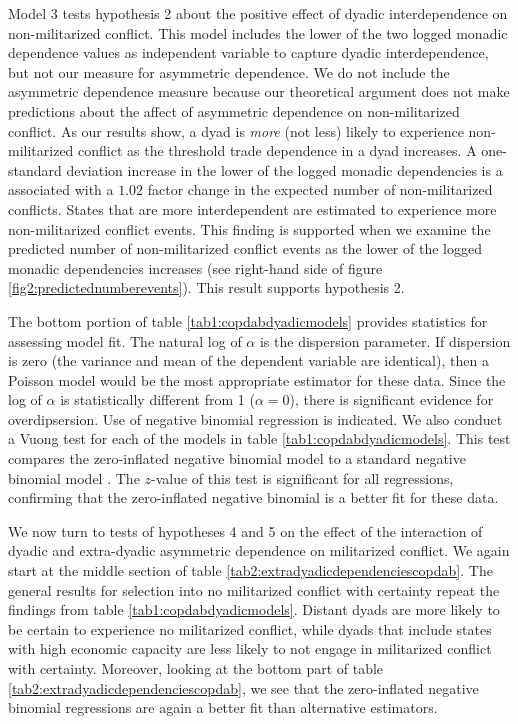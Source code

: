 \documentclass[12pt]{article}
\theoremstyle{hypothesis}
\begin{document}
Model 3 tests hypothesis 2 about the positive effect of dyadic interdependence on non-militarized conflict. This model includes the lower of the two logged monadic dependence values as independent variable to capture dyadic interdependence, but not our measure for asymmetric dependence. We do not include the asymmetric dependence measure because our theoretical argument does not make predictions about the affect of asymmetric dependence on non-militarized conflict. As our results show, a dyad is \textit{more} (not less) likely to experience non-militarized conflict as the threshold trade dependence in a dyad increases. A one-standard deviation increase in the lower of the logged monadic dependencies is a associated with a $1.02$ factor change in the expected number of non-militarized conflicts. States that are more interdependent are estimated to experience more non-militarized conflict events. This finding is supported when we examine the predicted number of non-militarized conflict events as the lower of the logged monadic dependencies increases (see right-hand side of figure \ref{fig2:predictednumberevents}). This result supports hypothesis 2.

The bottom portion of table \ref{tab1:copdabdyadicmodels} provides statistics for assessing model fit. The natural log of $\alpha$ is the dispersion parameter. If dispersion is zero (the variance and mean of the dependent variable are identical), then a Poisson model would be the most appropriate estimator for these data. Since the log of $\alpha$ is statistically different from 1 ($\alpha = 0$), there is significant evidence for overdipsersion.  Use of negative binomial regression is indicated.  We also conduct a Vuong test for each of the models in table \ref{tab1:copdabdyadicmodels}. This test compares the zero-inflated negative binomial model to a standard negative binomial model \citep{Vuong:1989}. The $z$-value of this test is significant for all regressions, confirming that the zero-inflated negative binomial is a better fit for these data.



We now turn to tests of hypotheses 4 and 5 on the effect of the interaction of dyadic and extra-dyadic asymmetric dependence on militarized conflict. We again start at the middle section of table \ref{tab2:extradyadicdependenciescopdab}. The general results for selection into no militarized conflict with certainty repeat the findings from table \ref{tab1:copdabdyadicmodels}. Distant dyads are more likely to be certain to experience no militarized conflict, while dyads that include states with high economic capacity are less likely to not engage in militarized conflict with certainty. Moreover, looking at the bottom part of table \ref{tab2:extradyadicdependenciescopdab}, we see that the zero-inflated negative binomial regressions are again a better fit than alternative estimators.
\end{document}
